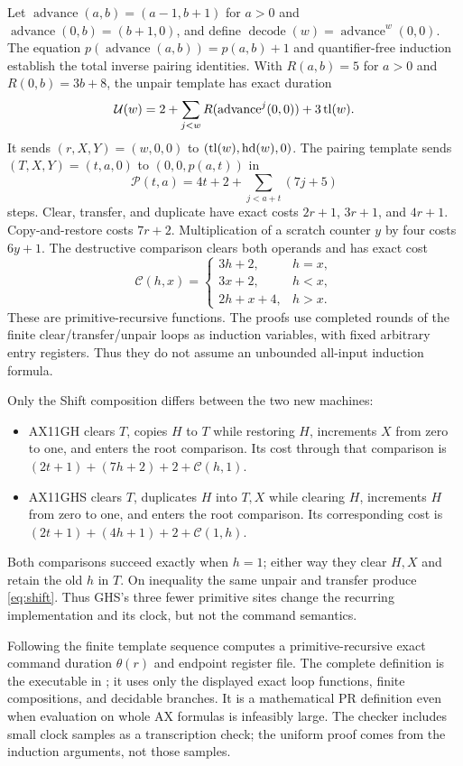 Let $\operatorname{advance}(a,b)=(a-1,b+1)$ for $a>0$ and
$\operatorname{advance}(0,b)=(b+1,0)$, and define
$\operatorname{decode}(w)=\operatorname{advance}^{w}(0,0)$.
The equation $p(\operatorname{advance}(a,b))=p(a,b)+1$ and
quantifier-free induction establish the total inverse pairing
identities. With $R(a,b)=5$ for $a>0$ and $R(0,b)=3b+8$, the
unpair template has exact duration
\[
 \mathcal U(w)=
 2+\sum_{j<w}R(\operatorname{advance}^{j}(0,0))+3\operatorname{tl}(w).
\]
It sends $(r,X,Y)=(w,0,0)$ to $(\operatorname{tl}(w),\operatorname{hd}(w),0)$.
The pairing template sends $(T,X,Y)=(t,a,0)$ to
$(0,0,p(a,t))$ in
\[
 \mathcal P(t,a)=4t+2+\sum_{j<a+t}(7j+5)
\]
steps. Clear, transfer, and duplicate have exact costs
$2r+1$, $3r+1$, and $4r+1$. Copy-and-restore costs $7r+2$.
Multiplication of a scratch counter $y$ by four costs $6y+1$.
The destructive comparison clears both operands and has exact cost
\[
 \mathcal C(h,x)=
 \begin{cases}
 3h+2,&h=x,\\
 3x+2,&h<x,\\
 2h+x+4,&h>x.
 \end{cases}
\]
These are primitive-recursive functions. The proofs use completed
rounds of the finite clear/transfer/unpair loops as induction
variables, with fixed arbitrary entry registers. Thus they do not
assume an unbounded all-input induction formula.

Only the Shift composition differs between the two new machines:
\begin{itemize}
\item AX11GH clears $T$, copies $H$ to $T$ while restoring $H$,
increments $X$ from zero to one, and enters the root comparison.
Its cost through that comparison is
$(2t+1)+(7h+2)+2+\mathcal C(h,1)$.
\item AX11GHS clears $T$, duplicates $H$ into $T,X$ while clearing
$H$, increments $H$ from zero to one, and enters the root
comparison. Its corresponding cost is
$(2t+1)+(4h+1)+2+\mathcal C(1,h)$.
\end{itemize}
Both comparisons succeed exactly when $h=1$; either way they clear
$H,X$ and retain the old $h$ in $T$. On inequality the same unpair
and transfer produce \eqref{eq:shift}. Thus GHS's three fewer
primitive sites change the recurring implementation and its clock,
but not the command semantics.

Following the finite template sequence computes a primitive-recursive
exact command duration $\theta(r)$ and endpoint register file.
The complete definition is the executable
 in ; it uses
only the displayed exact loop functions, finite compositions, and
decidable branches. It is a mathematical PR definition even when
evaluation on whole AX formulas is infeasibly large.
The checker includes small clock samples as a transcription check;
the uniform proof comes from the induction arguments, not those
samples.

